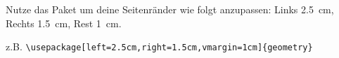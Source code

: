 \item Nutze das Paket  um deine Seitenränder wie folgt anzupassen: Links \SI{2.5}{cm}, Rechts \SI{1.5}{cm}, Rest \SI{1}{cm}.\label{geometry}
\begin{loesung}
    z.B. \verb|\usepackage[left=2.5cm,right=1.5cm,vmargin=1cm]{geometry}|
\end{loesung}
